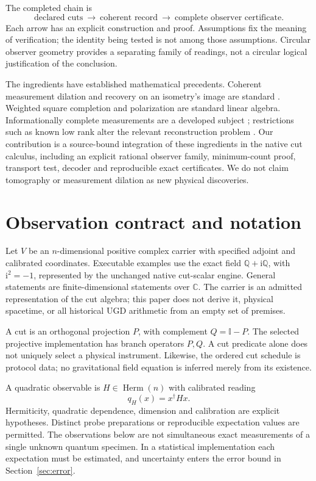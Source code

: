 \documentclass[11pt,a4paper]{article}
\newcommand{\adj}{\dagger}
\newcommand{\ii}{\mathrm{i}}
\newcommand{\Id}{\mathbb I}
\newcommand{\Herm}{\operatorname{Herm}}
\newcommand{\qform}[2]{q_{#1}(#2)}
\begin{document}
The completed chain is
\begin{equation}
\text{declared cuts}\ \longrightarrow\ \text{coherent record}\
\longrightarrow\ \text{complete observer certificate}.
\end{equation}
Each arrow has an explicit construction and proof. Assumptions fix the
meaning of verification; the identity being tested is not among those
assumptions. Circular observer geometry provides a separating family of
readings, not a circular logical justification of the conclusion.

The ingredients have established mathematical precedents. Coherent
measurement dilation and recovery on an isometry's image are standard
\cite{watrous}. Weighted square completion and polarization are standard
linear algebra. Informationally complete measurements are a developed
subject \cite{scott}; restrictions such as known low rank alter the relevant
reconstruction problem \cite{baldwin}. Our contribution is a source-bound
integration of these ingredients in the native cut calculus, including an
explicit rational observer family, minimum-count proof, transport test,
decoder and reproducible exact certificates. We do not claim tomography or
measurement dilation as new physical discoveries.

\section{Observation contract and notation}

Let $V$ be an $n$-dimensional positive complex carrier with specified adjoint
and calibrated coordinates. Executable examples use the exact field
$\mathbb Q+\ii\mathbb Q$, with $\ii^2=-1$, represented by the unchanged native
cut-scalar engine. General statements are finite-dimensional statements over
$\mathbb C$. The carrier is an admitted representation of the cut algebra;
this paper does not derive it, physical spacetime, or all historical UGD
arithmetic from an empty set of premises.

A cut is an orthogonal projection $P$, with complement $Q=\Id-P$. The
selected projective implementation has branch operators $P,Q$. A cut
predicate alone does not uniquely select a physical instrument. Likewise,
the ordered cut schedule is protocol data; no gravitational field equation
is inferred merely from its existence.

A quadratic observable is $H\in\Herm(n)$ with calibrated reading
\begin{equation}\label{eq:q}
\qform{H}{x}=x^\adj Hx.
\end{equation}
Hermiticity, quadratic dependence, dimension and calibration are explicit
hypotheses. Distinct probe preparations or reproducible expectation values
are permitted. The observations below are not simultaneous exact
measurements of a single unknown quantum specimen. In a statistical
implementation each expectation must be estimated, and uncertainty enters
the error bound in Section~\ref{sec:error}.
\end{document}
